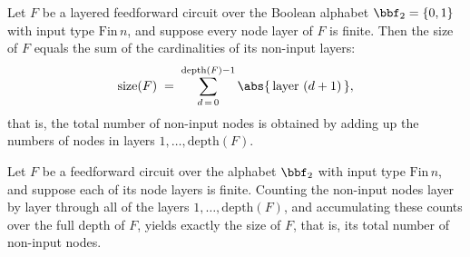 \begin{lemma}
\label{RazborovSmolensky.size_eq_sum_cards}
\leanok
{}
Let $F$ be a layered feedforward circuit over the Boolean alphabet $\bbf_2 = \{0,1\}$
with input type $\mathrm{Fin}\,n$, and suppose every node layer of $F$ is finite. Then
the size of $F$ equals the sum of the cardinalities of its non-input layers:
\[
\mathrm{size}(F) \;=\; \sum_{d\,=\,0}^{\mathrm{depth}(F)-1} \abs{\,\text{layer }
(d+1)\,},
\]
that is, the total number of non-input nodes is obtained by adding up the numbers of
nodes in layers $1, \dots, \mathrm{depth}(F)$.
\end{lemma}

\begin{lemma}
\label{RazborovSmolensky.gateCountBefore_depth_eq_size}
\leanok
{}
Let $F$ be a feedforward circuit over the alphabet $\bbf_2$ with input type
$\mathrm{Fin}\,n$, and suppose each of its node layers is finite. Counting the non-input
nodes layer by layer through all of the layers $1,\dots,\mathrm{depth}(F)$, and
accumulating these counts over the full depth of $F$, yields exactly the size of $F$,
that is, its total number of non-input nodes.
\end{lemma}

